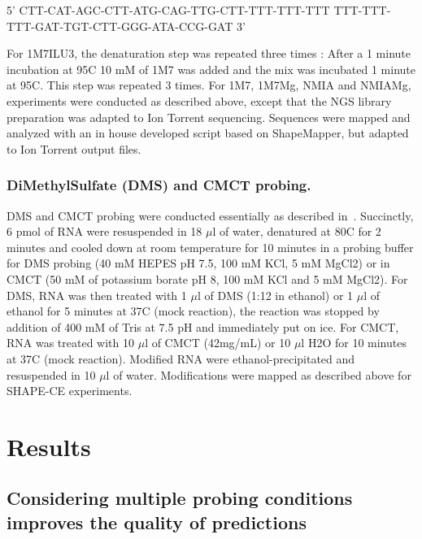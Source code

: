\documentclass[a4,center,fleqn]{NAR}
\begin{document}
{\centering {}%
5' CTT-CAT-AGC-CTT-ATG-CAG-TTG-CTT-TTT-TTT-TTT
   TTT-TTT-TTT-GAT-TGT-CTT-GGG-ATA-CCG-GAT 3'\\}

For 1M7ILU3, the denaturation step was repeated three times : After a 1 minute incubation at 95\degree{}C 10 mM of 1M7 was added and the mix was incubated 1 minute at 95\degree{}C. This step was repeated 3 times. For 1M7, 1M7Mg, NMIA and NMIAMg, experiments were conducted as described above, except that the NGS library preparation was adapted to Ion Torrent sequencing. Sequences were mapped and analyzed with an in house developed script based on ShapeMapper, but adapted to Ion Torrent output files.


\subsubsection{DiMethylSulfate (DMS) and CMCT probing.}
DMS and CMCT probing were conducted essentially as described in~\cite{Weill2004,James2008}. Succinctly, 6 pmol of RNA were resuspended in 18 $\mu$l of water, denatured at 80\degree{}C for 2 minutes and cooled down at room temperature for 10 minutes in a probing buffer for DMS probing (40 mM HEPES pH 7.5, 100 mM KCl, 5 mM MgCl2) or in CMCT (50 mM of potassium borate pH 8, 100 mM KCl and 5 mM MgCl2). For DMS, RNA was then treated with 1 $\mu$l of DMS (1:12 in ethanol) or 1 $\mu$l of ethanol for 5 minutes at 37\degree{}C (mock reaction), the reaction was stopped by addition of 400 mM of Tris at 7.5 pH and immediately put on ice. For CMCT,  RNA was treated with 10 $\mu$l of CMCT (42mg/mL) or 10 $\mu$l H2O for 10 minutes at 37\degree{}C (mock reaction). Modified RNA were ethanol-precipitated and resuspended in 10 $\mu$l of water. Modifications were mapped as described above for SHAPE-CE experiments.

\section{Results}


\subsection{Considering multiple probing conditions improves the quality of predictions}\label{sec:cordero}

%
\end{document}
